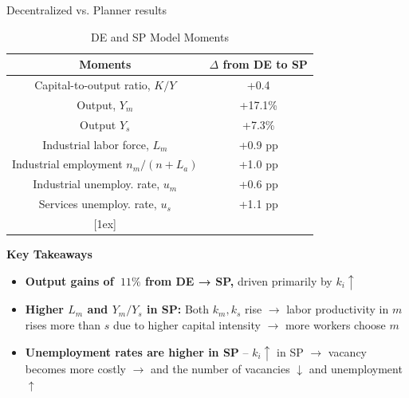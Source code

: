 \documentclass[9pt,xcolor={svgnames}]{beamer}
\begin{document}
\begin{frame}{Decentralized vs. Planner results }

\begin{table}[h!]
\centering
\caption{DE and SP Model Moments}
 \begin{tabular}{||c  c||} 
 \hline
 \textbf{Moments} &  \textbf{$\Delta$ from DE to SP} \\  
 \hline\hline
  Capital-to-output ratio, $K/Y$     &   +0.4\\
 Output, $Y_m$  & +17.1\% \\
  Output $Y_s$  & +7.3\% \\
  Industrial labor force, $L_m$ &  +0.9 pp \\
  Industrial employment $n_m/(n+L_a)$  & +1.0 pp\\
  Industrial unemploy. rate, $u_m$ & +0.6 pp  \\ 
   Services unemploy. rate,  $u_s$  & +1.1 pp \\ 
 [1ex] 
 \hline
 \end{tabular}
 
\end{table} 


\textbf{Key Takeaways}
\begin{itemize}
  \item  \textbf{Output gains of $~11\%$ from DE → SP,} driven primarily by $k_i \uparrow$
\medskip
         \item \textbf{Higher $L_m$ and $Y_m/Y_s$ in SP:} Both $k_m, k_s$ rise $\rightarrow$ labor productivity in $m$ rises more than $s$ due to higher capital intensity   $\rightarrow$ more workers choose $m$

          \item \textbf{Unemployment rates are higher in SP} -- $k_i \uparrow$ in SP $\rightarrow$ vacancy becomes more costly $\rightarrow$ and the number of vacancies $\downarrow$ and unemployment $\uparrow$  
         
\end{itemize}
\end{frame}
\end{document}
